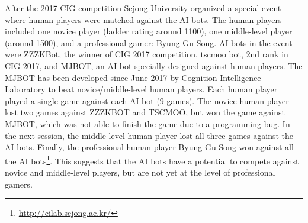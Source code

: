After the 2017 CIG competition Sejong University organized a special event where human players were matched against the AI bots. The human players included one novice player (ladder rating around 1100), one middle-level player (around 1500), and a professional gamer: Byung-Gu Song. AI bots in the event were ZZZKBot, the winner of CIG 2017 competition, tscmoo bot, 2nd rank in CIG 2017, and MJBOT, an AI bot specially designed against human players. The MJBOT has been developed since June 2017 by Cognition Intelligence Laboratory to beat novice/middle-level human players. Each human player played a single game against each AI bot (9 games). The novice human player lost two games against ZZZKBOT and TSCMOO, but won the game against MJBOT, which was not able to finish the game due to a programming bug. In the next session, the middle-level human player lost all three games against the AI bots. Finally, the professional human player Byung-Gu Song won against all the AI bots\footnote{\url{http://cilab.sejong.ac.kr/}}. This suggests that the AI bots have a potential to compete against novice and middle-level players, but are not yet at the level of professional gamers. 

